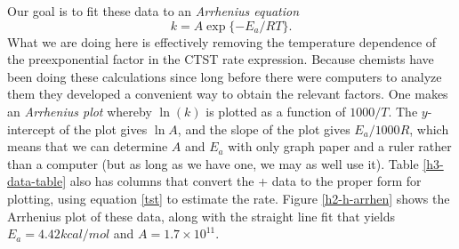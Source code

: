 Our goal is to fit these data to an \emph{Arrhenius equation}
\begin{equation}
 k = A\exp\{-E_a/RT\}.
\end{equation}
What we are doing here is effectively removing the temperature
dependence of the preexponential factor in the CTST rate expression.
Because chemists have been doing these calculations since long before
there were computers to analyze them they developed a convenient way
to obtain the relevant factors. One makes an \emph{Arrhenius plot}
whereby $\ln(k)$ is plotted as a function of $1000/T$. The
$y$-intercept of the plot gives $\ln{A}$, and the slope of the plot
gives $E_a/1000R$, which means that we can determine $A$ and $E_a$
with only graph paper and a ruler rather than a computer (but as long
as we have one, we may as well use it). Table \ref{h3-data-table} also
has columns that convert the + data to the proper
form for plotting, using equation \ref{tst} to estimate the
rate. Figure \ref{h2-h-arrhen} shows the Arrhenius plot of these data,
along with the straight line fit that yields $E_a=4.42 kcal/mol$ and
$A=1.7\times 10^{11}$. 

